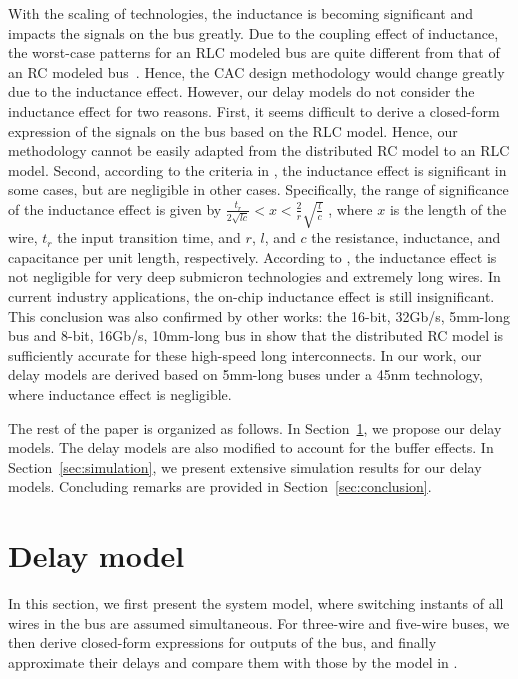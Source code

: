 \documentclass[10pt,journal]{IEEEtran}
\begin{document}
With the scaling of technologies, the inductance is becoming significant and impacts the signals on the bus greatly. Due to the coupling effect of inductance, the worst-case patterns for an RLC modeled bus are quite different from that of an RC modeled bus~\cite{Tu06}. Hence, the CAC design methodology would change greatly due to the inductance effect.
However, our delay models do not consider the inductance effect  for two reasons.
First, it seems difficult to derive a closed-form expression of the signals on the bus based on the RLC model. Hence, our methodology cannot be easily adapted from the distributed RC model to an RLC model. Second, according to the criteria in \cite{Ism99}, the inductance effect is significant in some cases, but are negligible in other cases. Specifically, the range of significance of the inductance effect is given by $\frac{t_r}{2\sqrt{lc}}<x<\frac{2}{r}\sqrt{\frac{l}{c}}$ \cite{Ism99}, where $x$ is the length of the wire, $t_r$ the input transition time, and $r$, $l$, and $c$ the resistance, inductance, and capacitance per unit length, respectively.
According to \cite{CSLJ_JLPE08}, the inductance effect is not negligible for very deep submicron technologies and extremely long wires.
In current industry applications, the on-chip inductance effect is still insignificant. This conclusion was also confirmed by other works: the 16-bit, 32Gb/s, 5mm-long bus and 8-bit, 16Gb/s, 10mm-long bus in \cite{Zha09} show that the distributed RC model is sufficiently accurate for these high-speed long interconnects. In our work, our delay models are derived based on 5mm-long buses under a 45nm technology, where inductance effect is negligible.














The rest of the paper is organized as follows. In Section~\ref{sec:model}, we propose our delay models. The delay models are also modified to account for the buffer effects.
In Section~\ref{sec:simulation}, we present extensive simulation results for our delay models. Concluding remarks are provided in Section~\ref{sec:conclusion}.

\section{Delay model}
\label{sec:model}

In this section, we first present the system model, where switching instants of all wires in the bus are assumed simultaneous. For three-wire and five-wire buses, we then derive closed-form expressions for outputs of the bus, and finally approximate their delays and compare them with those by the model in \cite{Sot01}.
\end{document}
